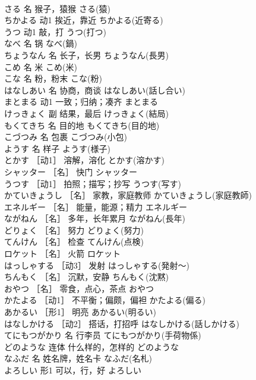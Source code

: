 \documentclass[8pt]{extreport}
\begin{document}
\begin{CJK}{UTF8}{min}
\\	さる	名	猴子，猿猴	さる(猿)	
\\	ちかよる	动1	挨近，靠近	ちかよる(近寄る)	
\\	うつ	动1	敲，打	うつ(打つ)	
\\	なべ	名	锅	なべ(鍋)	
\\	ちょうなん	名	长子，长男	ちょうなん(長男)	
\\	こめ	名	米	こめ(米)	
\\	こな	名	粉，粉末	こな(粉)	
\\	はなしあい	名	协商，商谈	はなしあい(話し合い)	
\\	まとまる	动1	一致；归纳；凑齐	まとまる	
\\	けっきょく	副	结果，最后	けっきょく(結局)	
\\	もくてきち	名	目的地	もくてきち(目的地)	
\\	こづつみ	名	包裹	こづつみ(小包)	
\\	ようす	名	样子	ようす(様子)	
\\	とかす	［动1］	溶解，溶化	とかす(溶かす)	
\\	シャッター	［名］	快门	シャッター	
\\	うつす	［动1］	拍照；描写；抄写	うつす(写す)	
\\	かていきょうし	［名］	家教，家庭教师	かていきょうし(家庭教師)	
\\	エネルギー	［名］	能量，能源；精力	エネルギー	
\\	ながねん	［名］	多年，长年累月	ながねん(長年)	
\\	どりょく	［名］	努力	どりょく(努力)	
\\	てんけん	［名］	检查	てんけん(点検)	
\\	ロケット	［名］	火箭	ロケット	
\\	はっしゃする	［动3］	发射	はっしゃする(発射～)	
\\	ちんもく	［名］	沉默，安静	ちんもく(沈黙)	
\\	おやつ	［名］	零食，点心，茶点	おやつ	
\\	かたよる	［动1］	不平衡；偏颇，偏袒	かたよる(偏る)	
\\	あかるい	［形1］	明亮	あかるい(明るい)	
\\	はなしかける	［动2］	搭话，打招呼	はなしかける(話しかける)	
\\	てにもつがかり	名	行李员	てにもつがかり(手荷物係)	
\\	どのような	连体	什么样的，怎样的	どのような	
\\	なふだ	名	姓名牌，姓名卡	なふだ(名札)	
\\	よろしい	形1	可以，行，好	よろしい	

\end{CJK}
\end{document}
